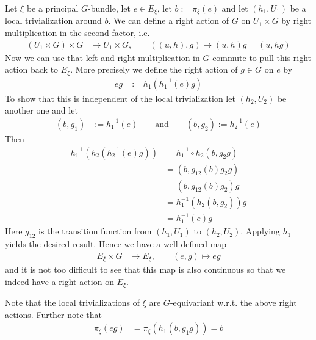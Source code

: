 \begin{cst}
\label{cst:rightactppal}
Let $\xi$ be a principal $G$-bundle, let $e \in E_{\xi}$, let $b := \pi_{\xi}(e)$ and let $(h_{1},U_{1})$ be a local trivialization around $b$. We can define a right action of $G$ on $U_{1} \times G$ by right multiplication in the second factor, i.e.
\begin{align*}
  (U_{1} \times G)
  \times
  G
  &\to
  U_{1} \times G
  ,\qquad
  ((u,h),g)
  \mapsto
  (u,h)g
  =
  (u,hg)
\end{align*}
Now we can use that left and right multiplication in $G$ commute to pull this right action back to $E_{\xi}$. More precisely we define the right action of $g \in G$ on $e$ by
\begin{align*}
  eg
  &:=
  h_{1}
  \left(
    h_{1}^{-1}(e)
    g
  \right)
\end{align*}
To show that this is independent of the local trivialization let $(h_{2},U_{2})$ be another one and let
\begin{align*}
  (b,g_{1})
  &:=
  h_{1}^{-1}(e)
  \qquad
  \text{and}
  \qquad
  (b,g_{2})
  :=
  h_{2}^{-1}(e)
\end{align*}
Then
\begin{align*}
  h_{1}^{-1}
  \left(
    h_{2}
    \left(
      h_{2}^{-1}(e)
      g
    \right)
  \right)
  &=
  h_{1}^{-1}
  \circ
  h_{2}
  \left(
    b
    ,
    g_{2}g
  \right)
  \\
  &=
  (b,g_{12}(b)g_{2}g)
  \\
  &=
  (b,g_{12}(b)g_{2})
  g
  \\
  &=
  h_{1}^{-1}
  \left(
    h_{2}(b,g_{2})
  \right)
  g
  \\
  &=
  h_{1}^{-1}(e)
  g
\end{align*}
Here $g_{12}$ is the transition function from $(h_{1},U_{1})$ to $(h_{2},U_{2})$. Applying $h_{1}$ yields the desired result. Hence we have a well-defined map
\begin{align*}
  E_{\xi}
  \times
  G
  &\to
  E_{\xi}
  ,\qquad
  (e,g)
  \mapsto
  eg
\end{align*}
and it is not too difficult to see that this map is also continuous so that we indeed have a right action on $E_{\xi}$.
\end{cst}
Note that the local trivializations of $\xi$ are $G$-equivariant w.r.t. the above right actions. Further note that
\begin{align*}
  \pi_{\xi}(eg)
  &=
  \pi_{\xi}
  \left(
    h_{1}(b,g_{1}g)
  \right)
  =
  b
\end{align*}
